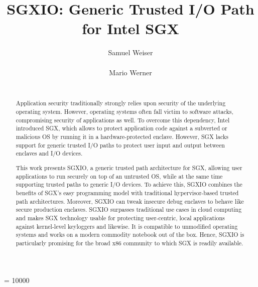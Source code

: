 \documentclass{sig-alternate-05-2015}
\begin{document}

\widowpenalty = 10000

\title{SGXIO: Generic Trusted I/O Path for Intel SGX}

\author{
\alignauthor
Samuel Weiser\\
       \\
\alignauthor
Mario Werner\\
       \\
}

\maketitle

\begin{abstract}

Application security traditionally strongly relies upon security of the underlying operating system. 
However, operating systems often fall victim to software attacks, compromising security of applications as well. 
To overcome this dependency, Intel introduced SGX, which allows to protect application code against a subverted or malicious OS by running it in a hardware-protected enclave. 
However, SGX lacks support for generic trusted I/O paths to protect user input and output between enclaves and I/O devices. 

This work presents SGXIO, a generic trusted path architecture for SGX, allowing user applications to run securely on top of an untrusted OS, while at the same time supporting trusted paths to generic I/O devices. 
To achieve this, SGXIO combines the benefits of SGX's easy programming model with traditional hypervisor-based trusted path architectures. 
Moreover, SGXIO can tweak insecure debug enclaves to behave like secure production enclaves. 
SGXIO surpasses traditional use cases in cloud computing and makes SGX technology usable for protecting user-centric, local applications against kernel-level keyloggers and likewise. 
It is compatible to unmodified operating systems and works on a modern commodity notebook out of the box. 
Hence, SGXIO is particularly promising for the broad x86 community to which SGX is readily available. 


\end{abstract}
\end{document}
